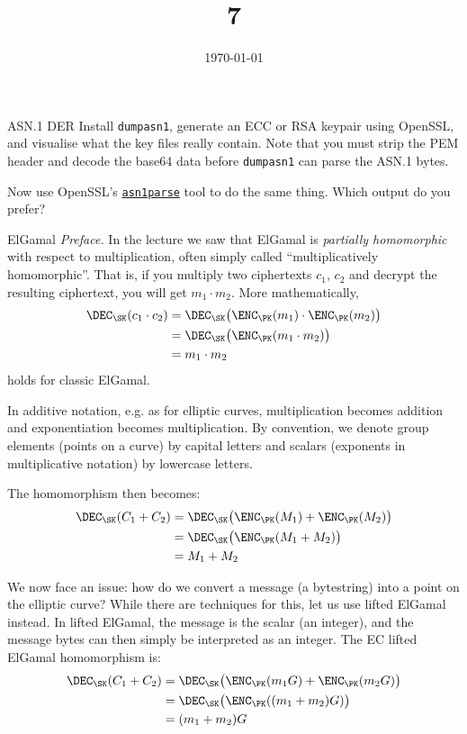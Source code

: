 \documentclass{practice}
\title{7}
\date{\today}
\begin{document}
\maketitle

\begin{task}{ASN.1 DER}
  Install \texttt{dumpasn1}, generate an ECC or RSA keypair using OpenSSL, and visualise what the key files really contain.
  Note that you must strip the PEM header and decode the base64 data before \texttt{dumpasn1} can parse the ASN.1 bytes.

  Now use OpenSSL's \href{https://docs.openssl.org/master/man1/openssl-asn1parse/}{\texttt{asn1parse}} tool to do the same thing.
  Which output do you prefer?
\end{task}

\begin{task}{ElGamal}
  \textit{Preface.}
  In the lecture we saw that ElGamal is \emph{partially homomorphic} with respect to multiplication, often simply called \enquote{multiplicatively homomorphic}.
  That is, if you multiply two ciphertexts $c_1$, $c_2$ and decrypt the resulting ciphertext, you will get $m_1 \cdot m_2$.
  More mathematically,
  \begin{align*}
    \DEC_\SK(c_1 \cdot c_2) &= 
    \DEC_\SK\bigl(\ENC_\PK(m_1) \cdot \ENC_\PK(m_2)\bigr)\\
    &= \DEC_\SK\bigl(\ENC_\PK(m_1\cdot m_2)\bigr)\\
    &= m_1 \cdot m_2
  \end{align*}
  holds for classic ElGamal.

  In additive notation, e.g. as for elliptic curves, multiplication becomes addition and exponentiation becomes multiplication.
  By convention, we denote group elements (points on a curve) by capital letters and scalars (exponents in multiplicative notation) by lowercase letters.

  The homomorphism then becomes:
  \begin{align*}
    \DEC_\SK(C_1 + C_2) &= 
    \DEC_\SK\bigl(\ENC_\PK(M_1) + \ENC_\PK(M_2)\bigr)\\
    &= \DEC_\SK\bigl(\ENC_\PK(M_1 + M_2)\bigr)\\
    &= M_1 + M_2
  \end{align*}

  We now face an issue: how do we convert a message (a bytestring) into a point on the elliptic curve?
  While there are techniques for this, let us use lifted ElGamal instead.
  In lifted ElGamal, the message is the scalar (an integer), and the message bytes can then simply be interpreted as an integer.
  The EC lifted ElGamal homomorphism is:
  \begin{align*}
    \DEC_\SK(C_1 + C_2) &= 
    \DEC_\SK\bigl(\ENC_\PK(m_1G) + \ENC_\PK(m_2G)\bigr)\\
    &= \DEC_\SK\bigl(\ENC_\PK((m_1 + m_2)G)\bigr)\\
    &= (m_1 + m_2)G
  \end{align*}


\end{task}
\end{document}
